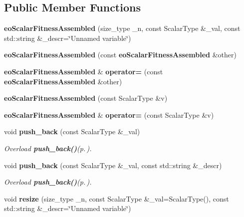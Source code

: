 \subsection*{Public Member Functions}
\begin{CompactItemize}
\item 
{\bf eo\-Scalar\-Fitness\-Assembled} (size\_\-type \_\-n, const Scalar\-Type \&\_\-val, const std::string \&\_\-descr=\char`\"{}Unnamed variable\char`\"{})\label{classeo_scalar_fitness_assembled_a1}

\item 
{\bf eo\-Scalar\-Fitness\-Assembled} (const {\bf eo\-Scalar\-Fitness\-Assembled} \&other)\label{classeo_scalar_fitness_assembled_a2}

\item 
{\bf eo\-Scalar\-Fitness\-Assembled} \& {\bf operator=} (const {\bf eo\-Scalar\-Fitness\-Assembled} \&other)\label{classeo_scalar_fitness_assembled_a3}

\item 
{\bf eo\-Scalar\-Fitness\-Assembled} (const Scalar\-Type \&v)\label{classeo_scalar_fitness_assembled_a4}

\item 
{\bf eo\-Scalar\-Fitness\-Assembled} \& {\bf operator=} (const Scalar\-Type \&v)\label{classeo_scalar_fitness_assembled_a5}

\item 
void {\bf push\_\-back} (const Scalar\-Type \&\_\-val)\label{classeo_scalar_fitness_assembled_a6}

\begin{CompactList}\small\item\em Overload {\bf push\_\-back()}{\rm (p.\,\pageref{classeo_scalar_fitness_assembled_a6})}. \item\end{CompactList}\item 
void {\bf push\_\-back} (const Scalar\-Type \&\_\-val, const std::string \&\_\-descr)\label{classeo_scalar_fitness_assembled_a7}

\begin{CompactList}\small\item\em Overload {\bf push\_\-back()}{\rm (p.\,\pageref{classeo_scalar_fitness_assembled_a6})}. \item\end{CompactList}\item 
void {\bf resize} (size\_\-type \_\-n, const Scalar\-Type \&\_\-val=Scalar\-Type(), const std::string \&\_\-descr=\char`\"{}Unnamed variable\char`\"{})\label{classeo_scalar_fitness_assembled_a8}


\end{CompactItemize}
